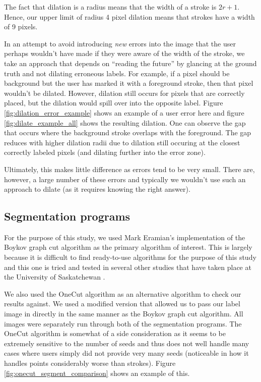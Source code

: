 \documentclass[12pt,a4paper,notitlepage]{article}
\begin{document}
The fact that dilation is a radius means that the width of a stroke is $2r + 1$. Hence, our upper limit of radius 4 pixel dilation means that strokes have a width of 9 pixels.

In an attempt to avoid introducing \textit{new} errors into the image that the user perhaps wouldn't have made if they were aware of the width of the stroke, we take an approach that depends on ``reading the future'' by glancing at the ground truth and not dilating erroneous labels. For example, if a pixel should be background but the user has marked it with a foreground stroke, then that pixel wouldn't be dilated. However, dilation still occurs for pixels that are correctly placed, but the dilation would spill over into the opposite label. Figure \ref{fig:dilation_error_example} shows an example of a user error here and figure \ref{fig:dilate_example_all} shows the resulting dilation. One can observe the gap that occurs where the background stroke overlaps with the foreground. The gap reduces with higher dilation radii due to dilation still occuring at the closest correctly labeled pixels (and dilating further into the error zone).

Ultimately, this makes little difference as errors tend to be very small. There are, however, a large number of these errors and typically we wouldn't use such an approach to dilate (as it requires knowing the right answer).

\subsection{Segmentation programs}
For the purpose of this study, we used Mark Eramian's implementation of the Boykov graph cut algorithm \cite{boykov_algorithm} as the primary algorithm of interest. This is largely because it is difficult to find ready-to-use algorithms for the purpose of this study and this one is tried and tested in several other studies that have taken place at the University of Saskatchewan \cite{rau}\cite{yuanxia}.

We also used the OneCut algorithm \cite{onecut} as an alternative algorithm to check our results against. We used a modified version \cite{onecutModified} that allowed us to pass our label image in directly in the same manner as the Boykov graph cut algorithm. All images were separately run through both of the segmentation programs. The OneCut algorithm is somewhat of a side consideration as it seems to be extremely sensitive to the number of seeds and thus does not well handle many cases where users simply did not provide very many seeds (noticeable in how it handles points considerably worse than strokes). Figure \ref{fig:onecut_segment_comparison} shows an example of this.
\end{document}
